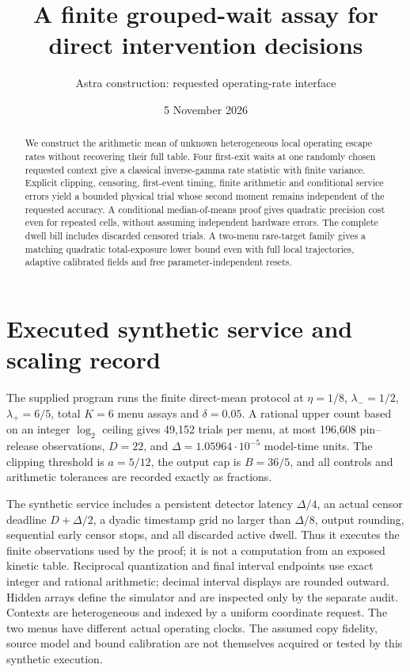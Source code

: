 \documentclass[11pt]{article}
\title{A finite grouped-wait assay for direct intervention decisions}
\author{Astra construction: requested operating-rate interface}
\date{5 November 2026}
\begin{document}
\maketitle
\begin{abstract}
We construct the arithmetic mean of unknown heterogeneous local operating
escape rates without recovering their full table. Four first-exit waits
at one randomly chosen requested context give a classical inverse-gamma
rate statistic with finite variance. Explicit clipping, censoring,
first-event timing, finite arithmetic and conditional service errors
yield a bounded physical trial whose second moment remains independent
of the requested accuracy. A conditional median-of-means proof gives
quadratic precision cost even for repeated cells, without assuming
independent hardware errors. The complete dwell bill includes discarded
censored trials. A two-menu rare-target family gives a matching
quadratic total-exposure lower bound even with full local trajectories,
adaptive calibrated fields and free parameter-independent resets.
\end{abstract}

\section{Executed synthetic service and scaling record}
The supplied program runs the finite direct-mean protocol at
$\eta=1/8$, $\lambda_-=1/2$, $\lambda_+=6/5$, total $K=6$ menu assays
and $\delta=0.05$. A rational upper count based on an integer
$\log_2$ ceiling gives 49,152 trials per menu, at most 196,608 pin--release
observations, $D=22$, and $\Delta=1.05964\cdot10^{-5}$ model-time units.
The clipping threshold is $a=5/12$, the output cap is $B=36/5$, and
all controls and arithmetic tolerances are recorded exactly as fractions.

The synthetic service includes a persistent detector latency
$\Delta/4$, an actual censor deadline $D+\Delta/2$, a dyadic timestamp
grid no larger than $\Delta/8$, output rounding, sequential early censor stops, and all
discarded active dwell. Thus it executes the finite observations used
by the proof; it is not a computation from an exposed kinetic table.
Reciprocal quantization and final interval endpoints use exact integer
and rational arithmetic; decimal interval displays are rounded outward.
Hidden arrays define the simulator and are inspected only by the
separate audit. Contexts are heterogeneous and indexed by a uniform
coordinate request. The two menus have different actual operating
clocks. The assumed copy fidelity, source model and bound calibration
are not themselves acquired or tested by this synthetic execution.
\end{document}
